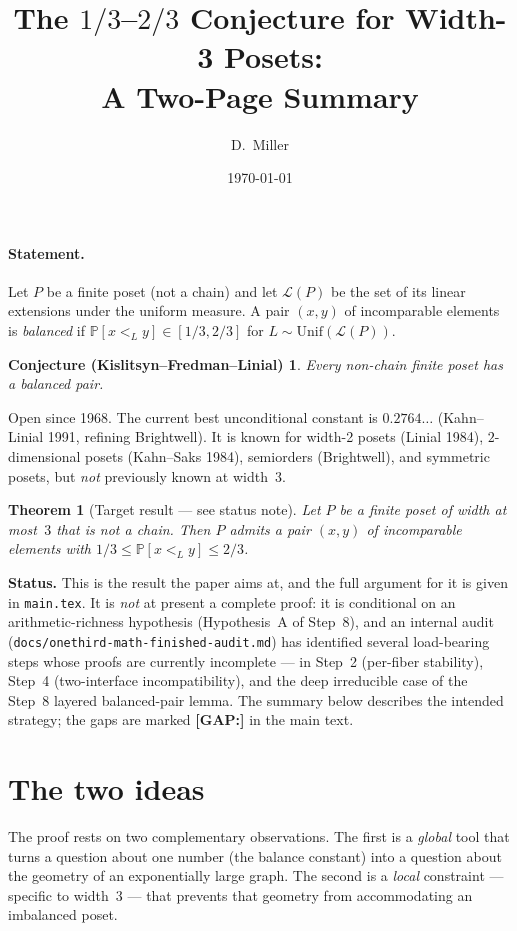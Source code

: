 \documentclass[11pt]{article}
\title{\vspace{-2em}The $1/3$--$2/3$ Conjecture for Width-3 Posets:\\
       A Two-Page Summary}
\author{D.~Miller}
\date{\today}
\newtheorem{theorem}{Theorem}
\newtheorem*{conjecture*}{Conjecture (Kislitsyn--Fredman--Linial)}
\newcommand{\LP}{\mathcal{L}(P)}
\newcommand{\Pp}{\mathbb{P}}
\begin{document}
\maketitle
\vspace{-2em}

\paragraph{Statement.}
Let $P$ be a finite poset (not a chain) and let $\LP$ be the set of its
linear extensions under the uniform measure. A pair $(x,y)$ of
incomparable elements is \emph{balanced} if
$\Pp[x<_L y]\in[1/3,2/3]$ for $L\sim\mathrm{Unif}(\LP)$.

\begin{conjecture*}
Every non-chain finite poset has a balanced pair.
\end{conjecture*}

\noindent
Open since 1968. The current best unconditional constant is
$0.2764\ldots$ (Kahn--Linial 1991, refining Brightwell). It is known
for width-2 posets (Linial 1984), $2$-dimensional posets (Kahn--Saks
1984), semiorders (Brightwell), and symmetric posets, but
\emph{not} previously known at width~$3$.

\begin{theorem}[Target result --- see status note]
Let $P$ be a finite poset of width at most~$3$ that is not a chain.
Then $P$ admits a pair $(x,y)$ of incomparable elements with
$1/3\le\Pp[x<_L y]\le 2/3$.
\end{theorem}

\noindent\textbf{Status.} This is the result the paper aims at, and
the full argument for it is given in \texttt{main.tex}. It is
\emph{not} at present a complete proof: it is conditional on an
arithmetic-richness hypothesis (Hypothesis~A of Step~8), and an
internal audit (\texttt{docs/onethird-math-finished-audit.md}) has
identified several load-bearing steps whose proofs are currently
incomplete --- in Step~2 (per-fiber stability), Step~4
(two-interface incompatibility), and the deep irreducible case of the
Step~8 layered balanced-pair lemma. The summary below describes the
intended strategy; the gaps are marked \textbf{[GAP:]} in the main
text.

\section*{The two ideas}

The proof rests on two complementary observations. The first is a
\emph{global} tool that turns a question about one number (the
balance constant) into a question about the geometry of an
exponentially large graph. The second is a \emph{local} constraint
--- specific to width~$3$ --- that prevents that geometry from
accommodating an imbalanced poset.
\end{document}
